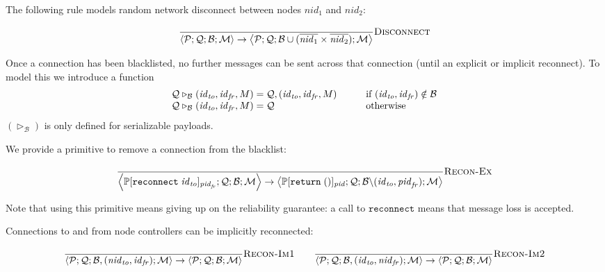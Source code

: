 \documentclass{article}
\newcommand{\sReturn}{\mathtt{return}}
\newcommand{\sReconnect}{\mathtt{reconnect}}
\newcommand{\sExtend}[1]{\mathrel{\triangleright_{#1}}}
\newcommand{\sNid}{\ensuremath{\mathit{nid}}}
\newcommand{\sPid}{\ensuremath{\mathit{pid}}}
\newcommand{\sId}{\ensuremath{\mathit{id}}}
\newcommand{\sSystem}[4]{\left\langle #1 ; #2 ; #3 ; #4 \right\rangle}
\newcommand{\sQueue}{\mathcal{Q}}
\newcommand{\sProcesses}{\mathcal{P}}
\newcommand{\sBlacklist}{\mathcal{B}}
\newcommand{\sMonitors}{\mathcal{M}}
\newcommand{\sCtxt}[1]{\mathbb{#1}}
\begin{document}
The following rule models random network disconnect between nodes $\sNid_1$ and
$\sNid_2$:

\begin{equation*}
\frac{
}{
  \sSystem{\sProcesses}{\sQueue}{\sBlacklist}{\sMonitors}
\rightarrow
  \sSystem{\sProcesses}{\sQueue}{\sBlacklist \cup (\overline{\sNid_1} \times \overline{\sNid_2})}{\sMonitors}
} \textsc{Disconnect}
\end{equation*}

Once a connection has been blacklisted, no further messages can be sent across
that connection (until an explicit or implicit reconnect). To model this we
introduce a function
%
\begin{equation*}
\begin{array}{l@{\;=\;}l@{\hspace{3em}}l}
  \sQueue \sExtend{\sBlacklist} (\sId_\mathit{to}, \sId_\mathit{fr}, M) 
& 
  \sQueue,  (\sId_\mathit{to}, \sId_\mathit{fr}, M)
&
  \text{if } (\sId_\mathit{to}, \sId_\mathit{fr}) \notin \sBlacklist
\\
  \sQueue \sExtend{\sBlacklist} (\sId_\mathit{to}, \sId_\mathit{fr}, M) 
& 
  \sQueue
&
  \text{otherwise}
\end{array}
\end{equation*}
%
$(\sExtend{\sBlacklist})$ is only defined for serializable payloads.

We provide a primitive to remove a connection from the blacklist:

\begin{equation*}
\frac{
}{
  \sSystem{\sCtxt{P}[ \sReconnect \; \sId_\mathit{to} ]_{\sPid_\mathit{fr}}}
          {\sQueue}
          {\sBlacklist}
          {\sMonitors}
\rightarrow
  \sSystem{\sCtxt{P}[ \sReturn \; () ]_\sPid}
          {\sQueue}
          {\sBlacklist \backslash (\sId_\mathit{to}, \sPid_\mathit{fr})}
          {\sMonitors}
} \textsc{Recon-Ex}
\end{equation*}

Note that using this primitive means giving up on the reliability guarantee: a
call to $\sReconnect$ means that message loss is accepted.

Connections to and from node controllers can be implicitly reconnected:

\begin{equation*}
\frac{
}{
  \sSystem{\sProcesses}{\sQueue}{\sBlacklist, (\sNid_\mathit{to}, \sId_\mathit{fr})}{\sMonitors}
\rightarrow
  \sSystem{\sProcesses}{\sQueue}{\sBlacklist}{\sMonitors}
} \textsc{Recon-Im1}
\qquad
\frac{
}{
  \sSystem{\sProcesses}{\sQueue}{\sBlacklist, (\sId_\mathit{to}, \sNid_\mathit{fr})}{\sMonitors}
\rightarrow
  \sSystem{\sProcesses}{\sQueue}{\sBlacklist}{\sMonitors}
} \textsc{Recon-Im2}
\end{equation*}
\end{document}

